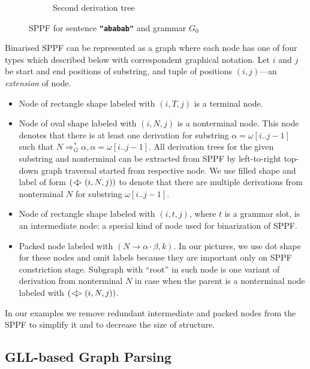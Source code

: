 \begin{figure}[ht]
\begin{center}
\begin{subfigure}[b]{0.3\textwidth}
        \caption{Second derivation tree}
        \label{tree2}        
    \end{subfigure}
    \caption{SPPF for sentence \textbf{\texttt{"ababab"}} and grammar $G_0$}
    \label{sppfSample}
    \end{center}                
\end{figure}

Binarised SPPF can be represented as a graph where each node has one of four types which described below with correspondent graphical notation.
Let $i$ and $j$ be start and end positions of substring, and tuple of positions $(i,j)$---an \textit{extension} of node.

\begin{itemize}
    \item Node of rectangle shape labeled with $(i, T, j)$ is a terminal node.     
    \item Node of oval shape labeled with $(i, N, j)$ is a nonterminal node. 
    This node denotes that there is at least one derivation for substring $\alpha=\omega[i..j-1]$ such that $N \Rightarrow^*_G \alpha, \alpha = \omega[i..j-1] $.
    All derivation trees for the given substring and nonterminal can be extracted from SPPF by left-to-right top-down graph traversal started from respective node. 
    We use filled shape and label of form $(<\mkern-11mu | \mkern-11mu> (i, N, j))$ to denote that there are multiple derivations from nonterminal $N$ for substring $\omega[i..j-1]$.
    \item Node of rectangle shape labeled with $(i,t,j)$, where $t$ is a grammar slot, is an intermediate node: a special kind of node used for binarization of SPPF.
    \item Packed node labeled with $(N \rightarrow \alpha \cdot \beta, k)$. In our pictures, we use dot shape for these nodes and omit labels because they are important only on SPPF constriction stage.
    Subgraph with ``root'' in such node is one variant of derivation from nonterminal $N$ in case when the parent is a nonterminal node labeled with $(<\mkern-9mu | \mkern-9mu> (i, N, j))$.

\end{itemize}

In our examples we remove redundant intermediate and packed nodes from the SPPF to simplify it and to decrease the size of structure.

\subsection{GLL-based Graph Parsing}

